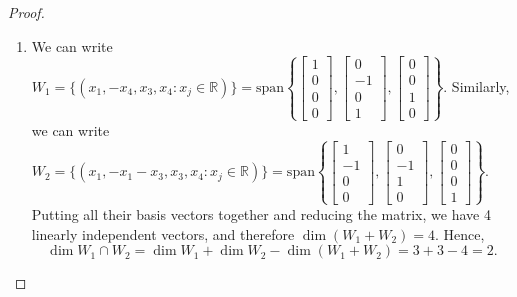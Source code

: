 \documentclass{article}
\begin{document}
\begin{proof}
\begin{enumerate}[label=(\alph*)]
        \item 
        We can write $W_1 = \{(x_1, -x_4, x_3, x_4:x_j\in\mathbb{R})\} = 
        \mathrm{span}\left\{\begin{bmatrix}
            1 \\ 0 \\ 0 \\ 0
        \end{bmatrix},\begin{bmatrix}
            0 \\ -1 \\ 0 \\ 1
        \end{bmatrix}, \begin{bmatrix}
            0 \\ 0 \\ 1 \\ 0
        \end{bmatrix}
        \right\}$. Similarly, we can write $W_2 = \{(x_1, -x_1-x_3, x_3, x_4:x_j\in\mathbb{R})\} =
        \mathrm{span}\left\{\begin{bmatrix}
            1 \\ -1 \\ 0 \\ 0
        \end{bmatrix},\begin{bmatrix}
            0 \\ -1 \\ 1 \\ 0
        \end{bmatrix}, \begin{bmatrix}
            0 \\ 0 \\ 0 \\ 1
        \end{bmatrix}
        \right\}$. Putting all their basis vectors together and reducing the matrix, we have 
        4 linearly independent vectors, and therefore $\dim (W_1+W_2)=4$. Hence, 
        $$\dim W_1 \cap W_2 = \dim W_1 + \dim W_2 - \dim (W_1+W_2) = 3 + 3 - 4 = 2.$$


\end{enumerate}
\end{proof}
\end{document}
